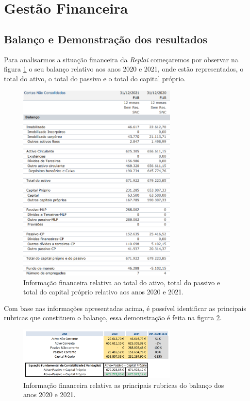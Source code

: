 \newpage
\section{Gestão Financeira}
\subsection{Balanço e Demonstração dos resultados}
Para analisarmos a situação financeira da \textit{Replai} começaremos por observar na figura \ref{fig:balanco_r} o seu balanço relativo aos anos 2020 e 2021, onde estão representados, o total do ativo, o total do passivo e o total do capital próprio.

\begin{figure}[ht]
    \centering
    \includegraphics[width=8cm]{images/balanco_replai.png}
    \caption{Informação financeira relativa ao total do ativo, total do passivo e total do capital próprio relativo aos anos 2020 e 2021.}
    \label{fig:balanco_r}
\end{figure}

Com base nas informações apresentadas acima, é possível identificar as principais rubricas que constituem o balanço, essa demonstração é feita na figura \ref{fig:balanco_g}.\\

\begin{figure}[ht]
    \centering
    \includegraphics[width=8cm]{images/balanco_gesta.png}
    \caption{Informação financeira relativa as principais rubricas do balanço dos anos 2020 e 2021.}
    \label{fig:balanco_g}
\end{figure}

